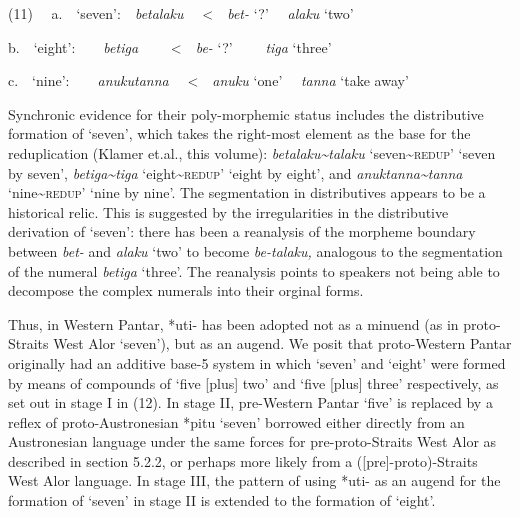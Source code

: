 (11) \ \ a.\ \ {\textquoteleft}seven{\textquoteright}:\ \ \textit{betalaku  }\ \ {\textless}\ \ \textit{bet-} {\textquoteleft}?{\textquoteright} \ \ \textit{alaku }{\textquoteleft}two{\textquoteright}\ \ 

b.\ \ {\textquoteleft}eight{\textquoteright}:\ \ \ \ \textit{betiga } \ \ \ \ {\textless}\ \ \textit{be-} {\textquoteleft}?{\textquoteright} \ \ \ \ \textit{tiga} {\textquoteleft}three{\textquoteright}

c.\ \ {\textquoteleft}nine{\textquoteright}:\ \ \ \ \textit{anukutanna}\textit{{\ng}}\textit{ }\ \ {\textless}\ \ \textit{anuku} {\textquoteleft}one{\textquoteright} \ \ \textit{tanna}\textit{{\ng}}\textit{ }{\textquoteleft}take away{\textquoteright}

Synchronic evidence for their poly-morphemic status includes the distributive formation of {\textquoteleft}seven{\textquoteright}, which takes the right-most element as the base for the reduplication (Klamer et.al., this volume): \textit{betalaku\~{}talaku }{\textquoteleft}seven\textsc{\~{}redup}{\textquoteright} {\textquoteleft}seven by seven{\textquoteright}, \textit{betiga\~{}tiga} {\textquoteleft}eight\textsc{\~{}redup}{\textquoteright} {\textquoteleft}eight by eight{\textquoteright}, and \textit{anuktanna}\textit{{\ng}}\textit{\~{}tanna}\textit{{\ng}}\textit{ }{\textquoteleft}nine\textsc{\~{}redup}{\textquoteright} {\textquoteleft}nine by nine{\textquoteright}. The segmentation in distributives appears to be a historical relic. This is suggested by the irregularities in the distributive derivation of {\textquoteleft}seven{\textquoteright}: there has been a reanalysis of the morpheme boundary between \textit{bet- }and \textit{alaku }{\textquoteleft}two{\textquoteright} to become \textit{be-talaku, }
analogous to the segmentation of the numeral \textit{betiga} {\textquoteleft}three{\textquoteright}. The reanalysis points to speakers not being able to decompose the complex numerals into their orginal forms.

Thus, in Western Pantar, *{\texthtb}uti- has been adopted not as a minuend (as in proto{}-Straits West Alor {\textquoteleft}seven{\textquoteright}), but as an augend. We posit that proto-Western Pantar originally had an additive base-5 system in which {\textquoteleft}seven{\textquoteright} and {\textquoteleft}eight{\textquoteright} were formed by means of compounds of {\textquoteleft}five [plus] two{\textquoteright} and {\textquoteleft}five [plus] three{\textquoteright} respectively, as set out in stage I in (12). In stage II, pre-Western Pantar {\textquoteleft}five{\textquoteright} is replaced by a reflex of proto-Austronesian *pitu {\textquoteleft}seven{\textquoteright} borrowed either directly from an Austronesian language under the same forces for pre-proto-Straits West Alor as described in section 5.2.2, or perhaps more likely from a ([pre]-proto)-Straits West Alor language. In stage III, the pattern of using *{\texthtb}uti- as an augend for the formation of {\textquoteleft}seven{\textquoteright} in 
stage II is extended to the formation of {\textquoteleft}eight{\textquoteright}.


